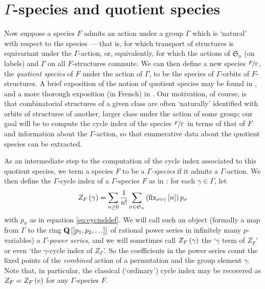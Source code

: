 \documentclass[sectionflow,singlespace,twoside]{brandiss} %
\numberwithin{section}{chapter}
\numberwithin{figure}{chapter}
\begin{document}
\section{$\Gamma$-species and quotient species}\label{s:quot}
Now suppose a species $F$ admits an action under a group $\Gamma$ which is `natural' with respect to the species --- that is, for which transport of structures is equivariant under the $\Gamma$-action, or, equivalently, for which the actions of $\mathfrak{S}_{n}$ (on labels) and $\Gamma$ on all $F$-structures commute.
We can then define a new species $\nicefrac{F}{\Gamma}$, the \emph{quotient species} of $F$ under the action of $\Gamma$, to be the species of $\Gamma$-orbits of $F$-structures.
A brief exposition of the notion of quotient species may be found in \cite[\S 3.6]{bll:species}, and a more thorough exposition (in French) in \cite{bous:species}.
Our motivation, of course, is that combinatorial structures of a given class are often `naturally' identified with orbits of structures of another, larger class under the action of some group; our goal will be to compute the cycle index of the species $\nicefrac{F}{\Gamma}$ in terms of that of $F$ and information about the $\Gamma$-action, so that enumerative data about the quotient species can be extracted.

As an intermediate step to the computation of the cycle index associated to this quotient species, we term a species $F$ to be a \emph{$\Gamma$-species} if it admits a $\Gamma$-action.
We then define the $\Gamma$-cycle index of a $\Gamma$-species $F$ as in \cite{hend:specfield}: for each $\gamma \in \Gamma$, let
\begin{equation} Z_{F} \left( {\gamma} \right) = \sum_{n \geq 0} \frac{1}{n!} \sum_{\sigma \in \mathfrak{S}_{n}} \left( {\operatorname{fix}_{\sigma \circ \gamma} \left[ {n} \right]} \right) p_{\sigma} \label{eq:gcycinddef} \end{equation}
with $p_{\sigma}$ as in equation \eqref{eq:cycinddef}.
We will call such an object (formally a map from $\Gamma$ to the ring $\mathbf{Q} \left[ {\left[ {p_{1}, p_{2}, \dots} \right]} \right]$ of rational power series in infinitely many $p$-variables) a \emph{$\Gamma$-power series}, and we will sometimes call $Z_{F} \left( {\gamma} \right)$ the `$\gamma$ term of $Z_{F}$' or even `the $\gamma$-cycle index of $Z_{F}$'.
So the coefficients in the power series count the fixed points of the \emph{combined} action of a permutation and the group element $\gamma$.
Note that, in particular, the classical (`ordinary') cycle index may be recovered as $Z_{F} = Z_{F} \left( {e} \right)$ for any $\Gamma$-species $F$.
\end{document}

